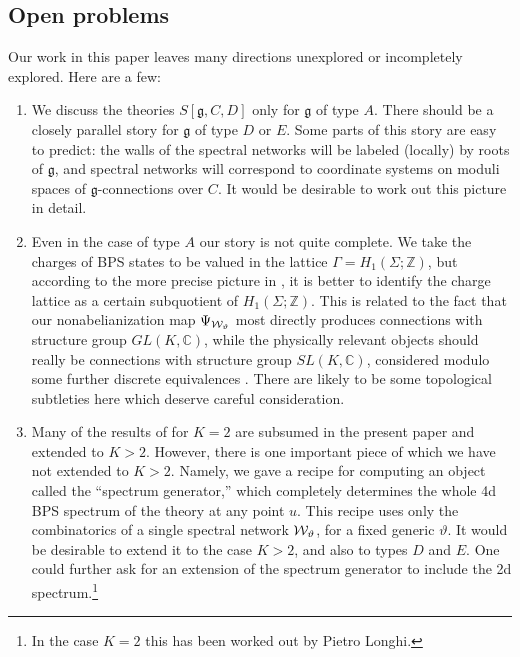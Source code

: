 \documentclass[11pt,a4paper]{article}
\def\IC{\mathbb{C}}
\def\IZ{{\mathbb{Z}}}
\def\fg{\mathfrak{g}}
\def\wnet {{\cal W}}
\def\fg{\mathfrak{g}}
\def\IC{\mathbb{C}}
\def\IZ{{\mathbb{Z}}}
\def\wnet {{\cal W}}
\begin{document}
\subsection*{Open problems}

Our work in this paper leaves many directions unexplored or incompletely explored.  Here are a few:

\begin{enumerate}

\item We discuss the theories $S[\fg, C, D]$ only for $\fg$ of type $A$.
There should be a closely
parallel story for $\fg$ of type $D$ or $E$.  Some parts of this story are easy to predict:
the walls of the spectral networks will be labeled (locally) by roots of $\fg$, and spectral networks will correspond
to coordinate systems on  moduli spaces of $\fg$-connections over $C$.  It would be desirable to work
out this picture in detail.

\item Even in the case of type $A$ our story is not quite complete.
We take the charges of BPS states to be valued in the lattice $\Gamma = H_1(\Sigma;\IZ)$,
but according to the more precise picture in \cite{Gaiotto:2009hg,Gaiotto:2010be},
it is better to identify the charge lattice as a certain subquotient of $H_1(\Sigma;\IZ)$.
This is related to the fact that our nonabelianization map $\Psi_{\wnet_\vartheta}$ most directly
produces connections with structure
group $GL(K,\IC)$, while the physically relevant objects should really be connections with
structure group $SL(K,\IC)$, considered modulo some further discrete equivalences \cite{Gaiotto:2010be}.
There are likely to be some topological subtleties here which deserve careful consideration.

\item Many of the results of \cite{Gaiotto:2009hg} for $K=2$ are subsumed in the present paper and extended to $K>2$.
However, there is one important piece of
\cite{Gaiotto:2009hg} which we have not extended to $K>2$.  Namely, we gave a recipe for computing an object called
the ``spectrum generator,'' which completely determines the whole 4d BPS spectrum of the theory at any point $u$.
This recipe uses only the combinatorics of a single spectral network $\wnet_\vartheta$, for a fixed generic $\vartheta$.
It would be desirable to extend it to the case $K>2$, and also to types $D$ and $E$.
One could further ask for an extension of the spectrum generator to include the 2d spectrum.\footnote{In
the case $K=2$ this has been worked out by Pietro Longhi.}


\end{enumerate}
\end{document}
